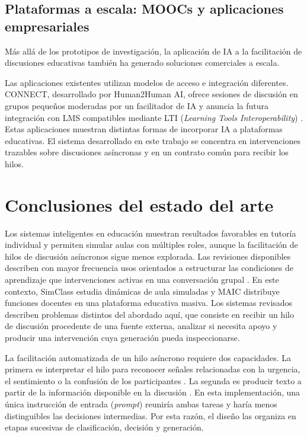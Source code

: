 \subsection{Plataformas a escala: MOOCs y aplicaciones empresariales}

Más allá de los prototipos de investigación, la aplicación de IA a la facilitación de discusiones educativas también ha generado soluciones comerciales a escala.

Las aplicaciones existentes utilizan modelos de acceso e integración diferentes. CONNECT, desarrollado por Human2Human AI, ofrece sesiones de discusión en grupos pequeños moderadas por un facilitador de IA y anuncia la futura integración con LMS compatibles mediante LTI (\textit{Learning Tools Interoperability}) \parencite{Human2Human2025}. Estas aplicaciones muestran distintas formas de incorporar IA a plataformas educativas. El sistema desarrollado en este trabajo se concentra en intervenciones trazables sobre discusiones asíncronas y en un contrato común para recibir los hilos.

\section{Conclusiones del estado del arte}

Los sistemas inteligentes en educación muestran resultados favorables en tutoría individual y permiten simular aulas con múltiples roles, aunque la facilitación de hilos de discusión asíncronos sigue menos explorada. Las revisiones disponibles describen con mayor frecuencia usos orientados a estructurar las condiciones de aprendizaje que intervenciones activas en una conversación grupal \parencite{CasebourneEtAl2025}. En este contexto, SimClass estudia dinámicas de aula simuladas y MAIC distribuye funciones docentes en una plataforma educativa masiva. Los sistemas revisados describen problemas distintos del abordado aquí, que consiste en recibir un hilo de discusión procedente de una fuente externa, analizar si necesita apoyo y producir una intervención cuya generación pueda inspeccionarse.

La facilitación automatizada de un hilo asíncrono requiere dos capacidades. La primera es interpretar el hilo para reconocer señales relacionadas con la urgencia, el sentimiento o la confusión de los participantes \parencite{WeiEtAl2017,AgrawalEtAl2015}. La segunda es producir texto a partir de la información disponible en la discusión \parencite{SengarEtAl2025,KilincKececioglu2024,BrownEtAl2020}. En esta implementación, una única instrucción de entrada (\textit{prompt}) reuniría ambas tareas y haría menos distinguibles las decisiones intermedias. Por esta razón, el diseño las organiza en etapas sucesivas de clasificación, decisión y generación.

